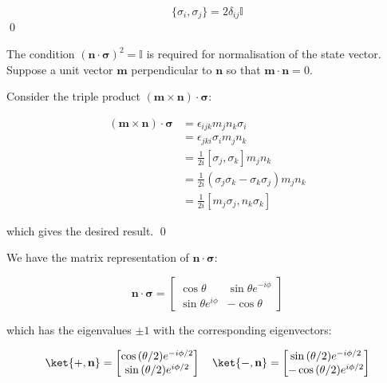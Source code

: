 \documentclass[12pt]{article}
\begin{document}
\begin{equation}
    \{ \sigma_{i}, \sigma_{j} \} = 2\delta_{ij} \mathbb{I}
\end{equation}
\qed


The condition $(\mathbf{n} \cdot \mathbf{\sigma})^2 = \mathbb{I}$ is required for normalisation of the state vector. Suppose a unit vector $\mathbf{m}$ perpendicular to $\mathbf{n}$ so that $\mathbf{m} \cdot \mathbf{n} = 0$.

Consider the triple product $(\mathbf{m} \times \mathbf{n}) \cdot \mathbf{\sigma}$:

\begin{equation}
\begin{split}
    (\mathbf{m} \times \mathbf{n}) \cdot \mathbf{\sigma} &= \epsilon_{ijk} m_{j} n_{k} \sigma_{i} \\
    &= \epsilon_{jki} \sigma_{i} m_{j} n_{k} \\
    &= \frac{1}{2i} [\sigma_{j}, \sigma_{k}] m_{j} n_{k} \\
    &= \frac{1}{2i} (\sigma_{j}\sigma_{k} - \sigma_{k}\sigma_{j}) m_{j} n_{k} \\
    &= \frac{1}{2i} [m_{j} \sigma_{j}, n_{k} \sigma_{k}]
\end{split}
\end{equation}

which gives the desired result.
\qed


We have the matrix representation of $\mathbf{n} \cdot \mathbf{\sigma}$:

\begin{equation}
    \mathbf{n} \cdot \mathbf{\sigma} =
    \begin{bmatrix}
        \cos{\theta} & \sin{\theta} e^{-i\phi} \\
        \sin{\theta} e^{i\phi} & -\cos{\theta}
    \end{bmatrix}
\end{equation}

which has the eigenvalues $\pm 1$ with the corresponding eigenvectors:

\begin{equation}
    \ket{+, \mathbf{n}} =
    \begin{bmatrix}
        \cos{(\theta/2)} e^{-i\phi/2} \\
        \sin{(\theta/2)} e^{i\phi/2}
    \end{bmatrix}
    \quad
    \ket{-, \mathbf{n}} =
    \begin{bmatrix}
        \sin{(\theta/2)} e^{-i\phi/2} \\
        -\cos{(\theta/2)} e^{i\phi/2}
    \end{bmatrix}
\end{equation}
\end{document}
